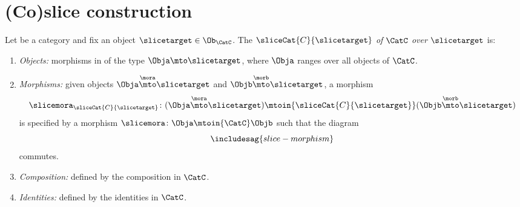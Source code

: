 
\section{(Co)slice construction}


\begin{ctdefinition}
    \label{def:slice-category}

    Let \CatC be a category and fix an object $\slicetarget \in \Ob_\CatC$.
    The  $\sliceCat{C}{\slicetarget}$ \emph{of} $\CatC$ \emph{over} $\slicetarget$ is:
    \begin{enumerate}
        \item \emph{Objects:} morphisms in \CatC of the type $\Obja \mto \slicetarget$, where $\Obja$ ranges over all objects of $\CatC$.
        \item \emph{Morphisms:} given objects $\Obja \overset{\mora}{\mto} \slicetarget$ and $\Objb \overset{\morb}{\mto} \slicetarget$, a morphism
              \begin{equation}
                  \slicemora_{\sliceCat{C}{\slicetarget}} \colon (\Obja \overset{\mora}{\mto} \slicetarget) 
                  \mtoin{\sliceCat{C}{\slicetarget}} (\Objb \overset{\morb}{\mto} \slicetarget)
              \end{equation}
              is specified by a morphism $\slicemora \colon \Obja \mtoin{\CatC} \Objb$ such that the diagram
              \begin{equation}\label{eq:slice-morphism}
                  \includesag{slice-morphism}
              \end{equation}
              commutes.

        \item \emph{Composition:} defined by the composition in $\CatC$.
        \item \emph{Identities:} defined by the identities in $\CatC$.
    \end{enumerate}
\end{ctdefinition}

